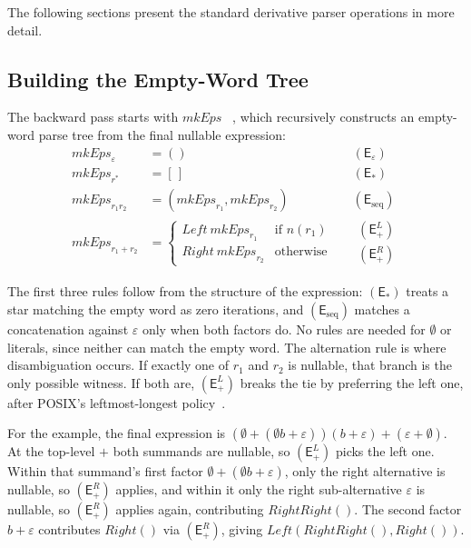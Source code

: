 The following sections present the standard derivative parser operations in more detail.

%
%
%

\subsection{Building the Empty-Word Tree}
\label{sec:mkeps-theory}

The backward pass starts with $\mathit{mkEps}$ ~\citep[Fig.~3]{sulzmannlu2014}, 
which recursively constructs an empty-word parse tree 
from the final nullable expression:
\begin{equation}\label{eq:mkeps}
\begin{aligned}
\mathit{mkEps}_{\varepsilon} &= () &&(\mathsf{E}_{\varepsilon}) \\
\mathit{mkEps}_{r^{*}} &= [\,] &&(\mathsf{E}_{*}) \\
\mathit{mkEps}_{r_1 r_2} &= (\mathit{mkEps}_{r_1}, \mathit{mkEps}_{r_2})
  &&(\mathsf{E}_{\mathrm{seq}}) \\
\mathit{mkEps}_{r_1+r_2} &=
  \begin{cases}
    \mathit{Left}\ \mathit{mkEps}_{r_1} & \text{if } n(r_1) \\
    \mathit{Right}\ \mathit{mkEps}_{r_2} & \text{otherwise}
  \end{cases}
  &&\begin{array}{l}(\mathsf{E}_{+}^{L}) \\ (\mathsf{E}_{+}^{R})\end{array}
\end{aligned}
\end{equation}

The first three rules follow from the structure of the expression:
$(\mathsf{E}_{*})$ treats a star matching the empty word as zero iterations, 
and $(\mathsf{E}_{\mathrm{seq}})$ matches a concatenation against $\varepsilon$ 
only when both factors do. 
No rules are needed for $\emptyset$ or literals, 
since neither can match the empty word. 
The alternation rule is where disambiguation occurs. 
If exactly one of $r_1$ and $r_2$ is nullable, 
that branch is the only possible witness. 
If both are, $(\mathsf{E}_{+}^{L})$ breaks the tie by preferring the left one,
after POSIX's leftmost-longest policy~\citep[Def.~1, rules A1/A2, p.~4]{sulzmannlu2014}.

For the example, the final expression is
$(\emptyset + (\emptyset b + \varepsilon))(b + \varepsilon) + (\varepsilon + \emptyset)$.
At the top-level $+$ both summands are nullable, 
so $(\mathsf{E}_{+}^{L})$ picks the left one. 
Within that summand's first factor $\emptyset + (\emptyset b + \varepsilon)$, 
only the right alternative is nullable, 
so $(\mathsf{E}_{+}^{R})$ applies, 
and within it only the right sub-alternative $\varepsilon$ is nullable, 
so $(\mathsf{E}_{+}^{R})$ applies again, contributing $\mathit{RightRight}()$. 
The second factor $b + \varepsilon$ contributes $\mathit{Right}()$ 
via $(\mathsf{E}_{+}^{R})$,
giving $\mathit{Left}(\mathit{RightRight}(),\mathit{Right}())$.

